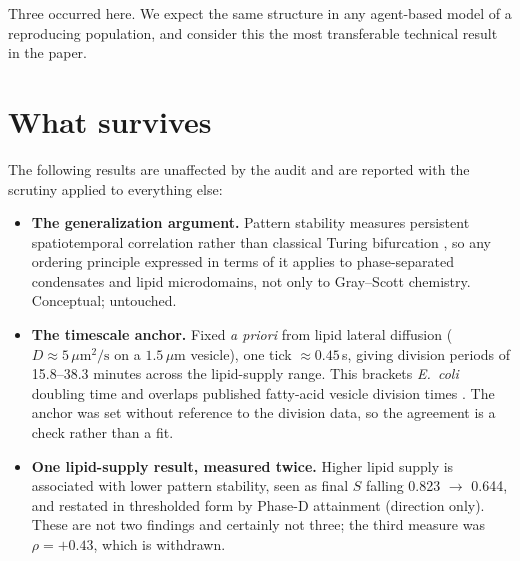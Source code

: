 \documentclass[11pt,letterpaper]{article}
\begin{document}
Three occurred here. We expect the same structure in any agent-based
model of a reproducing population, and consider this the most
transferable technical result in the paper.

\section{What survives}
\label{sec:survives}

The following results are unaffected by the audit and are reported with
the scrutiny applied to everything else:

\begin{itemize}
\item \textbf{The generalization argument.} Pattern stability measures
      persistent spatiotemporal correlation rather than classical Turing
      bifurcation \citep{turing1952,kondo2010}, so any ordering principle expressed in terms of it
      applies to phase-separated condensates and lipid microdomains, not
      only to Gray--Scott chemistry. Conceptual; untouched.
\item \textbf{The timescale anchor.} Fixed \emph{a priori} from lipid
      lateral diffusion ($D \approx 5\,\mu\mathrm{m}^2/\mathrm{s}$ on a
      $1.5\,\mu\mathrm{m}$ vesicle), one tick $\approx 0.45$\,s, giving
      division periods of 15.8--38.3 minutes across the lipid-supply
      range. This brackets \emph{E.\ coli} doubling time
      \citep{wang2010} and overlaps published fatty-acid vesicle
      division times \citep{zhu2009}. The anchor was set
      without reference to the division data, so the agreement is a
      check rather than a fit.
\item \textbf{One lipid-supply result, measured twice.} Higher lipid
      supply is associated with lower pattern stability, seen as final
      $S$ falling 0.823 $\to$ 0.644, and restated in thresholded form by
      Phase-D attainment (direction only). These are not two findings and
      certainly not three; the third measure was $\rho = +0.43$, which is
      withdrawn.


\end{itemize}
\end{document}
